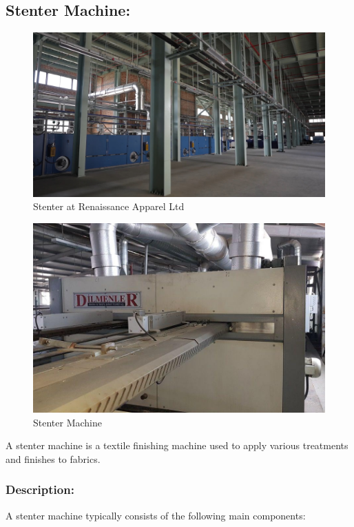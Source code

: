 \subsection{Stenter Machine:\cite{stenter_machine}}

\begin{figure}[h!]
  \centering
  \includegraphics[width=0.8\linewidth]{figs/stenter.jpg}
  \caption{Stenter at Renaissance Apparel Ltd}
  \label{fig:stenter}
\end{figure}

\begin{figure}[h!]
  \centering
  \includegraphics[width=0.8\linewidth]{figs/production/image3.jpg}
  \caption{Stenter Machine}
  \label{fig:Stenter Machine}
\end{figure}

A stenter machine is a textile finishing machine used to apply various
treatments and finishes to fabrics.


\subsubsection{Description:}


A stenter machine typically consists of the following main components:


